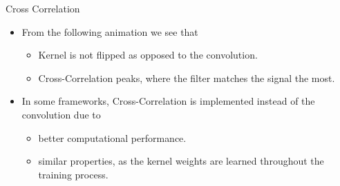 \documentclass[11pt,compress,t,notes=noshow, xcolor=table]{beamer}
\begin{document}
\begin{vbframe}{Cross Correlation}
    \begin{itemize}
        \item From the following animation we see that
        \begin{itemize}
            \item Kernel is not flipped as opposed to the convolution.
            \item Cross-Correlation peaks, where the filter matches the signal the most.    
        \end{itemize}
        \item In some frameworks, Cross-Correlation is implemented instead of the convolution due to
        \begin{itemize}
            \item better computational performance.
            \item similar properties, as the kernel weights are learned throughout the training process.
        \end{itemize}
    \end{itemize}
\end{vbframe}
 
\end{document}
